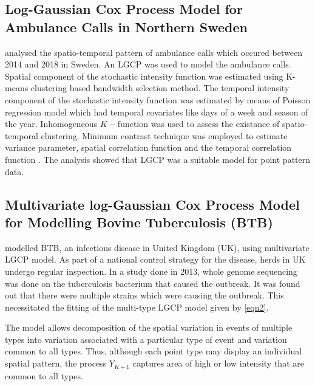\subsection{Log-Gaussian Cox Process Model for Ambulance Calls in Northern Sweden}

\citet{Bayisa:2020} analysed the spatio-temporal pattern of ambulance calls which occured between 2014 and 2018 in Sweden. An LGCP was used to model the ambulance calls. Spatial component of the stochastic intensity function was estimated using K-means clustering based bandwidth selection method. The temporal intensity component of the stochastic intensity function was estimated by means of Poisson regression model which had temporal covariates like days of a week and season of the year. Inhomogeneous $K-$function was used to assess the existance of spatio-temporal clustering. 
Minimum contrast technique was employed to estimate variance parameter, spatial correlation function and the temporal correlation function \citep{Bayisa:2020}. The analysis showed that LGCP was a suitable model for point pattern data.

\subsection{Multivariate log-Gaussian Cox Process Model for Modelling Bovine Tuberculosis (BTB)}

\citep{Diggle:2013} modelled BTB, an infectious disease in United Kingdom (UK), using multivariate LGCP model. As part of a national control strategy for the disease, herds in UK undergo regular inspection. In a study done in 2013, whole genome sequencing was done on the tuberculosis bacterium that caused the outbreak. It was found out that there were multiple strains which were causing the outbreak. This necessitated the fitting of the multi-type LGCP model given by \ref{eqn2}.

The model allows decomposition of the spatial variation in events of multiple types into variation associated with a particular type of event and variation common to all types. Thus, although each point type may display an individual spatial pattern, the process $Y_{K+1}$ captures area of high or low intensity that are common to all types.